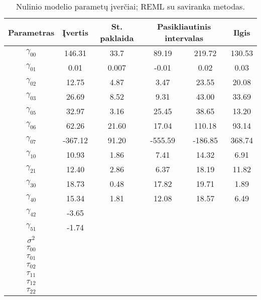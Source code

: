 \documentclass[12pt,a4paper]{article}
\begin{document}
\begin{small}
\begin{table}[H]
\label{table:final}
\centering
\begin{tabular}{c|cc|cc|c}
\hline
Parametras & Įvertis & St. paklaida & \multicolumn{2}{c|}{Pasikliautinis intervalas}&Ilgis\\
\hline
$\gamma_{00}$ &146.31&33.7&89.19 &219.72&130.53\\
$\gamma_{01}$ &0.01&0.007&-0.01 &   0.02&0.03\\
$\gamma_{02}$ &12.75&4.87&3.47   &23.55&20.08\\
$\gamma_{03}$ &26.69&8.52&9.31   &43.00&33.69\\
$\gamma_{05}$ &32.97&3.16&25.45&   38.65&13.20\\
$\gamma_{06}$ &62.26&21.60&17.04  &110.18&93.14\\
$\gamma_{07}$ &-367.12 &91.20&-555.59 &-186.85&368.74\\
$\gamma_{10}$ &10.93&1.86&7.41& 14.32&6.91\\
$\gamma_{21}$ &12.40&2.86&6.37  & 18.19&11.82\\
$\gamma_{30}$ &18.73&0.48&17.82&   19.71&1.89\\
$\gamma_{40}$ &15.34&1.81&12.08 &  18.57&6.49\\
$\gamma_{42}$ &-3.65&&&&\\
$\gamma_{51}$ &-1.74&&&&\\
$\sigma^2$ &&&&&\\
$\tau_{00}$&&&&&\\
$\tau_{01}$&&&&&\\
$\tau_{02}$&&&&&\\
$\tau_{11}$&&&&&\\
$\tau_{12}$&&&&&\\
$\tau_{22}$&&&&&\\
\hline
\end{tabular}
\caption{Nulinio modelio parametų įverčiai; REML su saviranka metodas.}
\end{table}
\end{small}
\end{document}
